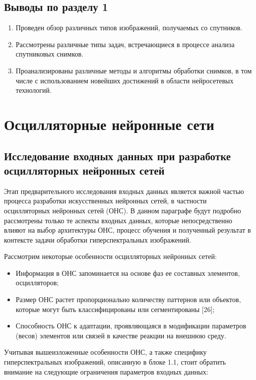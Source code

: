 \documentclass[14pt, russian]{scrartcl}
\begin{document}
\subsection{Выводы по разделу 1}
\begin{enumerate}
    \item Проведен обзор различных типов изображений, получаемых со спутников.
    \item Рассмотрены различные типы задач, встречающиеся в процессе анализа спутниковых снимков.
    \item Проанализированы различные методы и алгоритмы обработки снимков, в том числе с использованием новейших достижений в области нейросетевых технологий.
\end{enumerate}

\section{Осцилляторные нейронные сети}\label{Sect::onn}

\subsection{Исследование входных данных при разработке осцилляторных нейронных сетей}

Этап предварительного исследования входных данных является важной частью процесса разработки искусственных нейронных сетей, в частности осцилляторных нейронных сетей (ОНС). В данном параграфе будут подробно рассмотрены только те аспекты входных данных, которые непосредственно влияют  на выбор архитектуры ОНС, процесс обучения и полученный результат в контексте задачи обработки гиперспектральных изображений.

Рассмотрим некоторые особенности осцилляторных нейронных сетей:

\begin{itemize}
    \item Информация в ОНС запоминается на основе фаз ее составных элементов, осцилляторов;
    \item Размер ОНС растет пропорционально количеству паттернов или объектов, которые могут быть классифицированы или сегментированы [26];
    \item Способность ОНС к адаптации, проявляющаяся в модификации параметров (весов) элементов или связей в качестве реакции на внешнюю среду.
\end{itemize}

Учитывая вышеизложенные особенности ОНС, а также специфику гиперспектральных изображений, описанную в блоке 1.1, стоит обратить внимание на следующие ограничения параметров входных данных:
\end{document}

